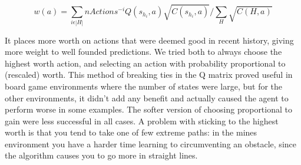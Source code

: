 \begin{equation}
	w(a) = \sum_{i\epsilon |H|} nActions^{-i} Q(s_{h_i},a) \sqrt{C(s_{h_i},a)}/\sum_H \sqrt{C(H,a)}
\end{equation}

It places more worth on actions that were deemed good in recent history, giving
more weight to well founded predictions. We tried both to always choose the
highest worth action, and selecting an action with probability proportional to
(rescaled) worth. This method of breaking ties in the Q matrix proved useful in
board game environments  where the number of states were large, but for the
other environments, it didn't add any benefit and actually caused the agent to
perform worse in some examples. The softer version of choosing proportional to
gain were less successful in all cases. A problem with sticking to the highest
worth is that you tend to take one of few extreme paths: in the mines
environment you have a harder time learning to circumventing an obstacle, since
the algorithm causes you to go more in straight lines.
